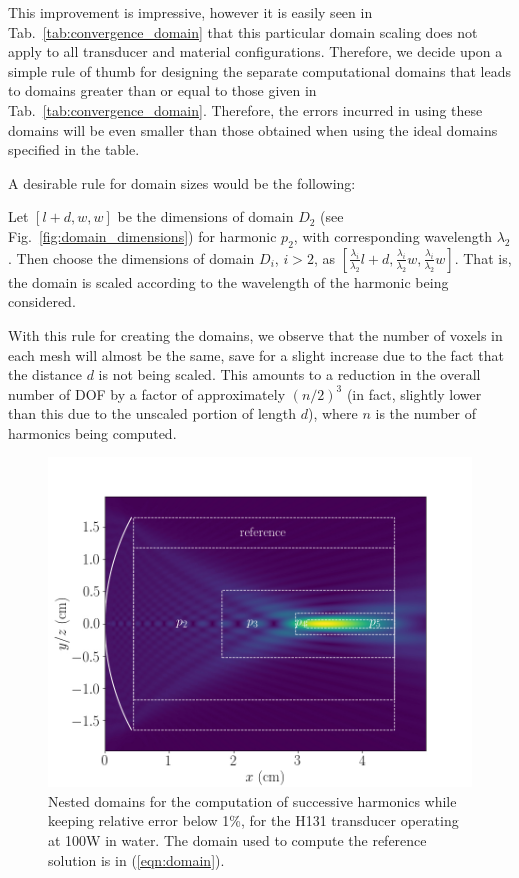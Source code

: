\documentclass[preprint]{JASA}
\begin{document}
This improvement is impressive, however it is easily seen in Tab.~\ref{tab:convergence_domain}
that this particular domain scaling does not apply to all transducer and material
configurations. Therefore, we decide upon a simple rule of thumb for designing
the separate computational domains that leads to domains greater than or 
equal to those given in Tab.~\ref{tab:convergence_domain}. Therefore, the errors 
incurred in using these domains will be even smaller than those obtained when using
the ideal domains specified in the table.

A desirable rule for domain sizes would be the following:
\begin{quoting}
    Let $[l+d, w, w]$ be the dimensions of domain $D_2$ (see Fig.~\ref{fig:domain_dimensions})
    for harmonic $p_2$, with corresponding wavelength $\lambda_2$. Then 
    choose the dimensions of domain $D_{i}$, $i>2$, as 
    $[\frac{\lambda_i}{\lambda_2}l+d, \frac{\lambda_i}{\lambda_2}w, \frac{\lambda_i}{\lambda_2}w]$. That is,
    the domain is scaled according to the wavelength of the harmonic being considered.
\end{quoting}
With this rule for creating the domains, we observe that the number of voxels in 
each mesh will almost be the same, save for a slight increase due to the 
fact that the distance $d$ is not being scaled. This amounts to a reduction in 
the overall number of DOF by a factor of approximately $(n/2)^3$ (in fact, slightly
lower than this due to the unscaled portion of length $d$), where $n$ 
is the number of harmonics being computed.


\begin{figure}[h!]
    \centering
    \includegraphics[width=\linewidth]{figures/H131_abs_subdomains}
    \caption{Nested domains for the computation of successive harmonics while
    keeping relative error below 1\%, for the H131 transducer operating at 100W 
    in water. The domain used to compute the reference 
    solution is in (\ref{eqn:domain}).}
    \label{fig:H131_water_subdomains}
\end{figure}  
\end{document}
